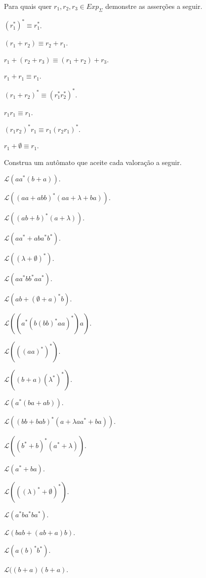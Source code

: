\begin{questao}\label{exer:EGR41}
	Para quais quer $r_1, r_2, r_3 \in Exp_\Sigma$ demonstre as asserções a seguir.
\end{questao}

\begin{exerList}
	\item $(r_1^*)^* \equiv r_1^*$.
	\item $(r_1 + r_2) \equiv r_2 + r_1$.
	\item $r_1 + (r_2 + r_3) \equiv (r_1 + r_2) + r_3$.
	\item $r_1 + r_1 \equiv r_1$.
	\item $(r_1 + r_2)^* \equiv (r_1^* r_2^*)^*$.
	\item $r_1r_1 \equiv r_1$.
	\item $(r_1r_2)^*r_1 \equiv r_1(r_2r_1)^*$.
	\item $r_1 + \emptyset \equiv r_1$.
\end{exerList}

\begin{questao}\label{exer:EGR42}
	Construa um autômato que aceite cada valoração a seguir.
\end{questao}

\begin{exerList}
	\item $\mathcal{L}(aa^*(b + a))$.
	\item $\mathcal{L}((aa + abb)^*(aa + \lambda + ba))$.
	\item $\mathcal{L}((ab + b)^*(a + \lambda))$.
	\item $\mathcal{L}(aa^* + aba^*b^*)$.
	\item $\mathcal{L}((\lambda + \emptyset)^*)$.
	\item $\mathcal{L}(aa^*bb^*aa^*)$.
	\item $\mathcal{L}(ab + (\emptyset + a)^*b)$.
	\item $\mathcal{L}((a^*(b(bb)^*aa)^*)a)$.
	\item $\mathcal{L}(((aa)^*)^*)$.
	\item $\mathcal{L}((b + a)(\lambda^*)^*)$.
	\item $\mathcal{L}(a^*(ba + ab))$.
	\item $\mathcal{L}((bb + bab)^*(a + \lambda aa^* + ba))$.
	\item $\mathcal{L}((b^* + b)^*(a^* + \lambda))$.
	\item $\mathcal{L}(a^* + ba)$.
	\item $\mathcal{L}(((\lambda)^* + \emptyset)^*)$.
	\item $\mathcal{L}(a^*ba^*ba^*)$.
	\item $\mathcal{L}(bab + (ab + a)b)$.
	\item $\mathcal{L}(a(b)^*b^*)$.
	\item $\mathcal{L}((b + a)(b + a)$.
\end{exerList}

